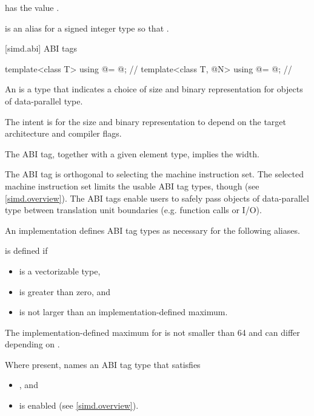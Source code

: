 \pnum
{} has the value .

\pnum
{} is an alias for a signed integer type  so that .

[simd.abi]{ ABI tags}

\begin{codeblock}
template<class T> using @\nativeabi@ = @\seebelow@; // \expos
template<class T, @\simdsizetype@ N> using @\deducet@ = @\seebelow@; // \expos
\end{codeblock}

\pnum\label{wording.ABI.tag}
An  is a type that indicates a choice of size and binary
representation for objects of data-parallel type.
\begin{note}
  The intent is for the size and binary representation to depend on the target
  architecture and compiler flags.
\end{note}
The ABI tag, together with a given element type, implies the width.

\pnum
\begin{note}
The ABI tag is orthogonal to selecting the machine instruction set.
The selected machine instruction set limits the usable ABI tag types, though
(see \ref{simd.overview}).
The ABI tags enable users to safely pass objects of data-parallel type between
translation unit boundaries (e.g. function calls or I/O).
\end{note}

\pnum
An implementation defines ABI tag types as necessary for the following aliases.

\pnum\label{wording.deducet}
 is defined if
\begin{itemize}
  \item {} is a vectorizable type,
  \item {} is greater than zero, and
  \item {} is not larger than an implementation-defined maximum.
\end{itemize}
The implementation-defined maximum for  is not smaller than 64
and can differ depending on .

\pnum
Where present,  names an ABI tag type that satisfies
\begin{itemize}
  \item {}, and
  \item {} is enabled (see \ref{simd.overview}).
\end{itemize}

